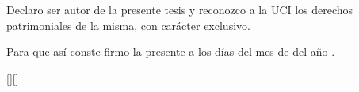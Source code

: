 
Declaro ser autor de la presente tesis y reconozco a la UCI los derechos patrimoniales de la misma, con carácter exclusivo.

\separator

Para que así conste firmo la presente a los \fillDay días del mes de \fillMonth del año \fillYear.

\separator
\separator

\thesisSignature{\authorOne}{\tutorOne}{\position}[\tutorTwo][\position]
